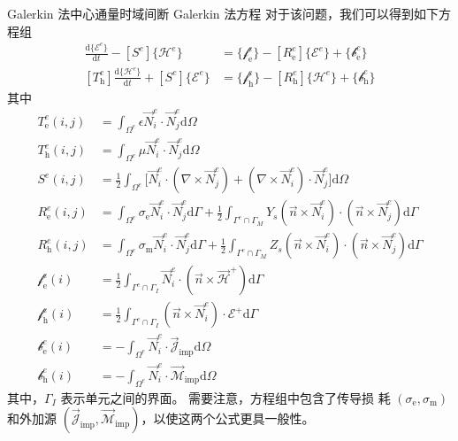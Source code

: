 \begin{theorem}{Galerkin 法}{中心通量时域间断 Galerkin 法方程}
    对于该问题，我们可以得到如下方程组
    \begin{align}
        [T^e_{\text{e}}]\frac{\text{d}\{\mathscr{E}^e\}}{\text{d}t}
        -[S^e]\{\mathscr{H}^e\}
        &=\{\mathscr{f}^e_\text{e}\}
        -[R^e_{\text{e}}]\{\mathscr{E}^e\}
        +\{\mathscr{b}^e_\text{e}\}\\
        [T^e_{\text{h}}]\frac{\text{d}\{\mathscr{H}^e\}}{\text{d}t}
        +[S^e]\{\mathscr{E}^e\}
        &=\{\mathscr{f}^e_\text{h}\}
        -[R^e_{\text{h}}]\{\mathscr{H}^e\}
        +\{\mathscr{b}^e_\text{h}\}
    \end{align}
    其中
    \begin{align}
        T^e_{\text{e}}(i,j)&=
        \int_{\Omega^e}\epsilon\vec{N}_i^e\cdot\vec{N}_j^e\text{d}\Omega\\
        T^e_{\text{h}}(i,j)&=
        \int_{\Omega^e}\mu\vec{N}_i^e\cdot\vec{N}_j^e\text{d}\Omega\\
        S^e(i,j)&=
        \frac{1}{2}\int_{\Omega^e}
        \Big[
            \vec{N}_i^e\cdot(\nabla\times\vec{N}_j^e)
            +(\nabla\times\vec{N}_i^e)\cdot\vec{N}_j^e
        \Big]
        \text{d}\Omega\\
        R^e_{\text{e}}(i,j)&=
        \int_{\Omega^e}\sigma_{\text{e}}\vec{N}_i^e\cdot\vec{N}_j^e\text{d}\Gamma
        +\frac{1}{2}\int_{\Gamma^e\cap\Gamma_M}
        Y_s(\vec{n}\times\vec{N}_i^e)\cdot(\vec{n}\times\vec{N}_j^e)\text{d}\Gamma\\
        R^e_{\text{h}}(i,j)&=
        \int_{\Omega^e}\sigma_{\text{m}}\vec{N}_i^e\cdot\vec{N}_j^e\text{d}\Gamma
        +\frac{1}{2}\int_{\Gamma^e\cap\Gamma_M}
        Z_s(\vec{n}\times\vec{N}_i^e)\cdot(\vec{n}\times\vec{N}_j^e)\text{d}\Gamma\\
        \mathscr{f}^e_\text{e}(i)&=
        \frac{1}{2}\int_{\Gamma^e\cap\Gamma_I}
        \vec{N}_i^e\cdot(\vec{n}\times\vec{\mathscr{H}}^+)\text{d}\Gamma\\
        \mathscr{f}^e_\text{h}(i)&=
        \frac{1}{2}\int_{\Gamma^e\cap\Gamma_I}
        (\vec{n}\times\vec{N}_i^e)\cdot\mathscr{E}^+\text{d}\Gamma\\
        \mathscr{b}^e_\text{e}(i)&=
        -\int_{\Omega^e}\vec{N}_i^e\cdot
        \vec{\mathscr{J}}_{\text{imp}}\text{d}\Omega\\
        \mathscr{b}^e_\text{h}(i)&=
        -\int_{\Omega^e}\vec{N}_i^e\cdot
        \vec{\mathscr{M}}_{\text{imp}}\text{d}\Omega
    \end{align}
    其中，$\Gamma_I$ 表示单元之间的界面。
    需要注意，方程组中包含了传导损
    耗 $(\sigma_{\text{e}},\sigma_{\text{m}})$ 
    和外加源 $(\vec{\mathscr{J}}_{\text{imp}},
    \vec{\mathscr{M}}_{\text{imp}})$，以使这两个公式更具一般性。
\end{theorem}

